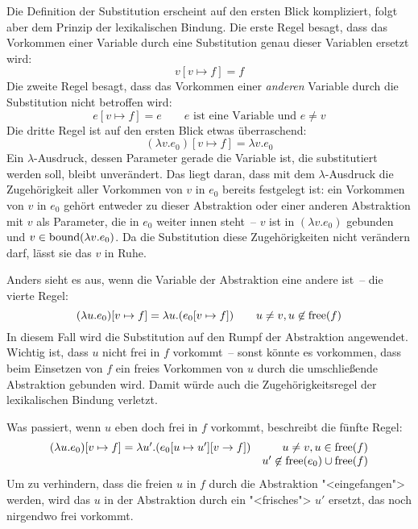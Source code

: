 %
Die Definition der Substitution erscheint auf den ersten Blick
kompliziert, folgt aber dem Prinzip der
lexikalischen Bindung.  Die erste Regel besagt, dass das Vorkommen
einer Variable durch eine Substitution genau dieser Variablen ersetzt
wird:
%
\begin{displaymath}
      v[v\mapsto f] = f
\end{displaymath}
%
Die zweite Regel besagt, dass das Vorkommen einer \emph{anderen}
Variable durch die Substitution nicht betroffen wird:
%
\begin{displaymath}
    e[v\mapsto f] = e \qquad e \text{ ist eine Variable und } e \neq v
\end{displaymath}
%
Die dritte Regel ist auf den ersten Blick etwas überraschend:
%
\begin{displaymath}
    (\lambda v.e_0)[v\mapsto f] = \lambda v.e_0
\end{displaymath}
%
Ein $\lambda$-Ausdruck, dessen Parameter gerade die Variable ist, die
substitutiert werden soll, bleibt unverändert.  Das liegt daran, dass
mit dem $\lambda$-Ausdruck die Zugehörigkeit aller Vorkommen von $v$
in $e_0$ bereits festgelegt ist: ein Vorkommen von $v$ in $e_0$ gehört
entweder zu dieser Abstraktion oder einer anderen Abstraktion mit $v$
als Parameter, die in $e_0$ weiter innen steht~-- $v$ ist in $(\lambda
v.e_0)$ gebunden und $v\in\operatorname{bound}(\lambda v.e_0)$.
Da die Substitution diese Zugehörigkeiten nicht verändern darf, lässt
sie das $v$ in Ruhe.

Anders sieht es aus, wenn die Variable der Abstraktion eine andere
ist~-- die vierte Regel:
%
\begin{displaymath}
  (\lambda u.e_0)[v\mapsto f]  = \lambda u.(e_0[v\mapsto f])
  \qquad u\neq v, u\not\in\operatorname{free}(f)
\end{displaymath}
%
In diesem Fall wird die Substitution auf den Rumpf der Abstraktion
angewendet.  Wichtig ist, dass $u$ nicht frei in $f$ vorkommt~-- sonst
könnte es vorkommen, dass beim Einsetzen von $f$ ein freies Vorkommen
von $u$ durch die umschließende Abstraktion gebunden wird.
Damit würde auch die Zugehörigkeitsregel der lexikalischen Bindung 
verletzt.

Was passiert, wenn $u$ eben doch frei in $f$ vorkommt, beschreibt die
fünfte Regel:
%
\begin{displaymath}
  \begin{array}{lr}
      (\lambda u.e_0)[v\mapsto f] = \lambda u'.(e_0[u\mapsto u'][v\rightarrow f])
    & u\neq v, u\in\operatorname{free}(f)\\& u'\not\in\operatorname{free}(e_0)\cup\operatorname{free}(f)
  \end{array}
\end{displaymath}
%
Um zu verhindern, dass die freien $u$ in $f$ durch die
Abstraktion "<eingefangen"> werden, wird das
$u$ in der Abstraktion durch ein
"<frisches"> $u'$ ersetzt, das noch nirgendwo frei vorkommt.

